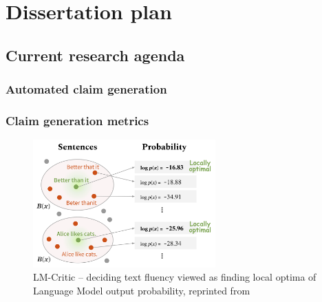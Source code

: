 
\chapter{Dissertation plan}
\label{chap:plan}


\section{Current research agenda}
\subsection{Automated claim generation}
\todo{}
\subsection{Claim generation metrics}

\begin{figure}
    \includegraphics[width=7cm]{fig/lm_critics.png}
    \caption{\textsf{LM-Critic} -- deciding text fluency viewed as finding local optima of Language Model output probability, reprinted from~\cite{yasunaga-etal-2021-lm}}
    \label{fig:lmcritic}
\end{figure}
\label{sec:metrics}

